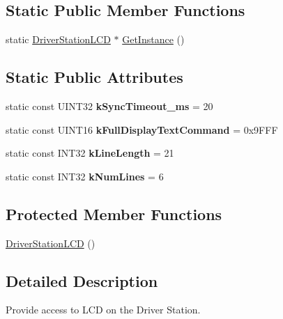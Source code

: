 \subsection*{Static Public Member Functions}
\begin{DoxyCompactItemize}
\item 
static \hyperlink{classDriverStationLCD}{DriverStationLCD} $\ast$ \hyperlink{classDriverStationLCD_a81d206a65012b4d84c3ce415ec13a5a3}{GetInstance} ()
\end{DoxyCompactItemize}
\subsection*{Static Public Attributes}
\begin{DoxyCompactItemize}
\item 
\hypertarget{classDriverStationLCD_a45038d2c69d132c5c79a1badcc5946fc}{
static const UINT32 {\bfseries kSyncTimeout\_\-ms} = 20}
\label{classDriverStationLCD_a45038d2c69d132c5c79a1badcc5946fc}

\item 
\hypertarget{classDriverStationLCD_a26f33bcca9271380c8f2ce8f8c2b1347}{
static const UINT16 {\bfseries kFullDisplayTextCommand} = 0x9FFF}
\label{classDriverStationLCD_a26f33bcca9271380c8f2ce8f8c2b1347}

\item 
\hypertarget{classDriverStationLCD_a08e533705d5cea74ef59aa7f5bfddc69}{
static const INT32 {\bfseries kLineLength} = 21}
\label{classDriverStationLCD_a08e533705d5cea74ef59aa7f5bfddc69}

\item 
\hypertarget{classDriverStationLCD_a13103ae669faff5bf9b44317727143b9}{
static const INT32 {\bfseries kNumLines} = 6}
\label{classDriverStationLCD_a13103ae669faff5bf9b44317727143b9}

\end{DoxyCompactItemize}
\subsection*{Protected Member Functions}
\begin{DoxyCompactItemize}
\item 
\hyperlink{classDriverStationLCD_ac94af42c92e3def74ed1005fdf0233d2}{DriverStationLCD} ()
\end{DoxyCompactItemize}


\subsection{Detailed Description}
Provide access to LCD on the Driver Station.

